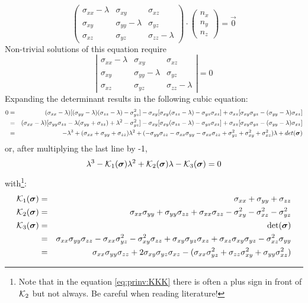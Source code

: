 \[
\left(\begin{array}{ccc}
\sigma_{xx}-\lambda & \sigma_{xy} & \sigma_{xz} \\
\sigma_{xy} & \sigma_{yy}-\lambda & \sigma_{yz} \\
\sigma_{xz} & \sigma_{yz} & \sigma_{zz} -\lambda
\end{array}\right)
\cdot
\left(\begin{array}{c}
n_x \\ n_y \\ n_z
\end{array}\right)
= \vec{0}
\]
Non-trivial solutions of this equation require 
\[
\left|  
\begin{array}{ccc}
\sigma_{xx}-\lambda & \sigma_{xy} & \sigma_{xz} \\
\sigma_{xy} & \sigma_{yy}-\lambda & \sigma_{yz} \\
\sigma_{xz} & \sigma_{yz} & \sigma_{zz} -\lambda
\end{array}
\right|
=0
\]
Expanding the determinant results in the following cubic equation:
\begin{eqnarray}
0 
&=&
(\sigma_{xx}-\lambda) [ ( \sigma_{yy}-\lambda )( \sigma_{zz} -\lambda)- \sigma_{yz}^2]
- \sigma_{xy} [ \sigma_{xy} ( \sigma_{zz} -\lambda) - \sigma_{yz} \sigma_{xz} ] 
+ \sigma_{xz} [ \sigma_{xy}  \sigma_{yz} - (\sigma_{yy}-\lambda )  \sigma_{xz} ]  \nonumber\\
&=& (\sigma_{xx}-\lambda) [ \sigma_{yy}\sigma_{zz} -\lambda (\sigma_{yy}+ \sigma_{zz})+ \lambda ^2- \sigma_{yz}^2]
- \sigma_{xy} [ \sigma_{xy} ( \sigma_{zz} -\lambda) - \sigma_{yz} \sigma_{xz} ] 
+ \sigma_{xz} [ \sigma_{xy}  \sigma_{yz} - (\sigma_{yy}-\lambda )  \sigma_{xz} ] \nonumber\\
&=& -\lambda^3
+ (\sigma_{xx} + \sigma_{yy} + \sigma_{zz} )\lambda^2
+ (-\sigma_{yy}\sigma_{zz} -\sigma_{xx}\sigma_{yy} -\sigma_{xx}\sigma_{zz} 
  +\sigma_{yz}^2 +\sigma_{xy}^2 + \sigma_{xz}^2 )\lambda
+ det({\bm \sigma}) \nonumber
\end{eqnarray}
or, after multiplying the last line by -1,
\begin{equation}
\lambda^3 - {\cal K}_1({\bm \sigma}) \lambda^2 + {\cal K}_2({\bm \sigma}) \lambda -{\cal K}_3({\bm \sigma})=0
\label{eq:prinv:KKK}
\end{equation}
with\footnote{Note that in the equation \eqref{eq:prinv:KKK} there is often a plus sign in front of ${\cal K}_2$ 
but not always. Be careful when reading literature!}:
\begin{eqnarray}
{\cal K}_1({\bm \sigma}) &=& \sigma_{xx}+\sigma_{yy}+\sigma_{zz}\nonumber\\
{\cal K}_2({\bm \sigma}) &=& \sigma_{xx}\sigma_{yy}+\sigma_{yy}\sigma_{zz}+\sigma_{xx}\sigma_{zz}
-\sigma_{xy}^2 -\sigma_{xz}^2 -\sigma_{yz}^2 \nonumber\\
{\cal K}_3({\bm \sigma}) 
&=& \det ({\bm \sigma}) \nonumber\\
&=& \sigma_{xx}\sigma_{yy}\sigma_{zz}-\sigma_{xx}\sigma_{yz}^2
-\sigma_{xy}^2\sigma_{zz}+\sigma_{xy}\sigma_{yz}\sigma_{xz}
+\sigma_{xz}\sigma_{xy}\sigma_{yz}-\sigma_{xz}^2\sigma_{yy} \nonumber\\
&=& \sigma_{xx}\sigma_{yy}\sigma_{zz}
+2\sigma_{xy}\sigma_{yz}\sigma_{xz}
-( \sigma_{xx}\sigma_{yz}^2 +  \sigma_{zz} \sigma_{xy}^2 + \sigma_{yy}\sigma_{xz}^2 )
\end{eqnarray}
